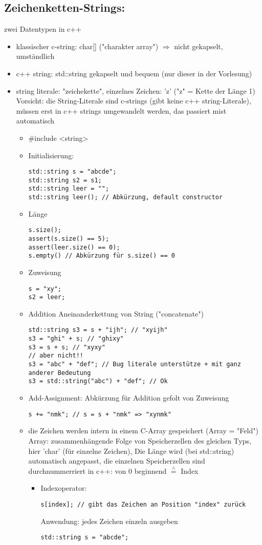 \documentclass[a4paper]{scrartcl}
\newcommand{\estimates}{\overset{\scriptscriptstyle\wedge}{=}}%
\begin{document}
\subsection{Zeichenketten-Strings:}
\label{sec-9-3}
zwei Datentypen in c++
\begin{itemize}
\item klassischer c-string: char[] ("charakter array") $\Rightarrow$ nicht gekapselt, umständlich
\item c++ string: std::string gekapselt und bequem (nur dieser in der Vorlesung)
\item string literale: "zeichekette", einzelnes Zeichen: 'z' ("z" = Kette der Länge 1) \\
     Vorsicht: die String-Literale sind c-strings (gibt keine c++ string-Literale), müssen erst in c++ strings umgewandelt werden, das passiert mist automatisch
\begin{itemize}
\item \#include <string>
\item Initialisierung:
\begin{verbatim}
std::string s = "abcde";
std::string s2 = s1;
std::string leer = "";
std::string leer(); // Abkürzung, default constructor
\end{verbatim}
\item Länge
\begin{verbatim}
s.size();
assert(s.size() == 5);
assert(leer.size() == 0);
s.empty() // Abkürzung für s.size() == 0
\end{verbatim}
\item Zuweisung
\begin{verbatim}
s = "xy";
s2 = leer;
\end{verbatim}
\item Addition
Aneinanderkettung von String ("concatenate")
\begin{verbatim}
std::string s3 = s + "ijh"; // "xyijh"
s3 = "ghi" + s; // "ghixy"
s3 = s + s; // "xyxy"
// aber nicht!!
s3 = "abc" + "def"; // Bug literale unterstütze + mit ganz anderer Bedeutung
s3 = std::string("abc") + "def"; // Ok
\end{verbatim}
\item Add-Assignment: Abkürzung für Addition gefolt von Zuweisung
\begin{verbatim}
s += "nmk"; // s = s + "nmk" => "xynmk"
\end{verbatim}
\item die Zeichen werden intern in einem C-Array gespeichert (Array = "Feld") \\
       Array: zusammenhängende Folge von Speicherzellen des gleichen Typs, hier 'char' (für einzelne Zeichen), Die Länge wird (bei std::string) automatisch angepasst, die einzelnen Speicherzellen sind durchnummerriert
in c++: von $0$ beginnend $\estimates$ Index
\begin{itemize}
\item Indexoperator:
\begin{verbatim}
s[index]; // gibt das Zeichen an Position "index" zurück
\end{verbatim}
Anwendung: jedes Zeichen einzeln ausgeben
\begin{verbatim}
std::string s = "abcde";


\end{verbatim}
\end{itemize}
\end{itemize}
\end{itemize}
\end{document}
